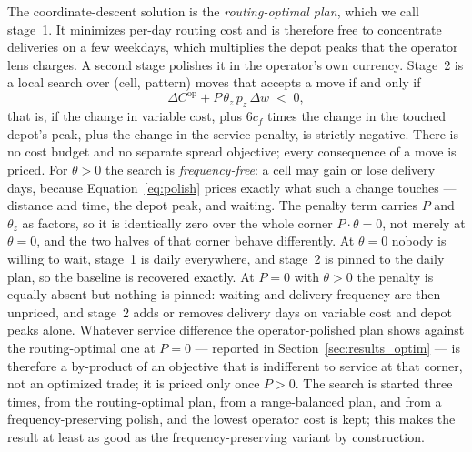 \documentclass[preprint,12pt,authoryear]{elsarticle}
\begin{document}
The coordinate-descent solution is the \emph{routing-optimal plan}, which we call stage~1. It minimizes per-day routing cost and is therefore free to concentrate deliveries on a few weekdays, which multiplies the depot peaks that the operator lens charges. A second stage polishes it in the operator's own currency. Stage~2 is a local search over (cell, pattern) moves that accepts a move if and only if
\begin{equation}
\label{eq:polish}
\Delta C^{\mathrm{op}} + P\, \theta_z\, p_z\, \Delta\bar{w} \;<\; 0 ,
\end{equation}
that is, if the change in variable cost, plus $6 c_f$ times the change in the touched depot's peak, plus the change in the service penalty, is strictly negative. There is no cost budget and no separate spread objective; every consequence of a move is priced. For $\theta > 0$ the search is \emph{frequency-free}: a cell may gain or lose delivery days, because Equation~\eqref{eq:polish} prices exactly what such a change touches --- distance and time, the depot peak, and waiting. The penalty term carries $P$ and $\theta_z$ as factors, so it is identically zero over the whole corner $P \cdot \theta = 0$, not merely at $\theta = 0$, and the two halves of that corner behave differently. At $\theta = 0$ nobody is willing to wait, stage~1 is daily everywhere, and stage~2 is pinned to the daily plan, so the baseline is recovered exactly. At $P = 0$ with $\theta > 0$ the penalty is equally absent but nothing is pinned: waiting and delivery frequency are then unpriced, and stage~2 adds or removes delivery days on variable cost and depot peaks alone. Whatever service difference the operator-polished plan shows against the routing-optimal one at $P = 0$ --- reported in Section~\ref{sec:results_optim} --- is therefore a by-product of an objective that is indifferent to service at that corner, not an optimized trade; it is priced only once $P > 0$. The search is started three times, from the routing-optimal plan, from a range-balanced plan, and from a frequency-preserving polish, and the lowest operator cost is kept; this makes the result at least as good as the frequency-preserving variant by construction.
\end{document}
